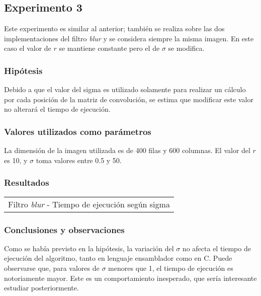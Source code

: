     \subsection{Experimento 3}
        Este experimento es similar al anterior; también se realiza sobre las dos implementaciones del filtro \emph{blur} y se considera siempre la misma imagen. En este caso el valor de $r$ se mantiene constante pero el de $\sigma$ se modifica.

            \subsubsection*{Hipótesis} 
                Debido a que el valor del sigma es utilizado solamente para realizar un cálculo por cada posición de la matriz de convolución, se estima que modificar este valor no alterará el tiempo de ejecución.

            \subsubsection*{Valores utilizados como parámetros} 
                La dimensión de la imagen utilizada es de 400 filas y 600 columnas. El valor del $r$ es 10, y $\sigma$ toma valores entre 0.5 y 50.

            \subsubsection*{Resultados}

            {\centering \begin{tabular}{c}
                {\small Filtro \emph{blur} - Tiempo de ejecución según sigma} \\
                \end{tabular}}

            \subsubsection*{Conclusiones y observaciones}
                Como se había previsto en la hipótesis, la variación del $\sigma$ no afecta el tiempo de ejecución del algoritmo, tanto en lenguaje ensamblador como en C. Puede observarse que, para valores de $\sigma$ menores que 1, el tiempo de ejecución es notoriamente mayor. Este es un comportamiento inesperado, que sería interesante estudiar posteriormente.


